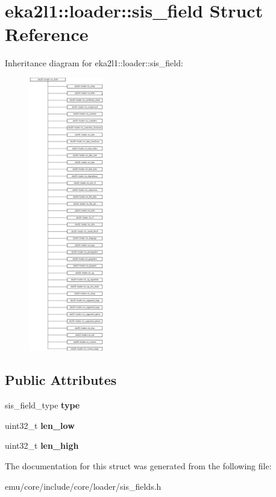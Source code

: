 \hypertarget{structeka2l1_1_1loader_1_1sis__field}{}\section{eka2l1\+:\+:loader\+:\+:sis\+\_\+field Struct Reference}
\label{structeka2l1_1_1loader_1_1sis__field}
Inheritance diagram for eka2l1\+:\+:loader\+:\+:sis\+\_\+field\+:\begin{figure}[H]
\begin{center}
\leavevmode
\includegraphics[height=12.000000cm]{structeka2l1_1_1loader_1_1sis__field}
\end{center}
\end{figure}
\subsection*{Public Attributes}
\begin{DoxyCompactItemize}
\item 
\mbox{\label{structeka2l1_1_1loader_1_1sis__field_a5154d4ff22171a592703770bfdabae35}} 
sis\+\_\+field\+\_\+type {\bfseries type}
\item 
\mbox{\label{structeka2l1_1_1loader_1_1sis__field_a8387bd8bbb6b786357b2b5ff527c1c7d}} 
uint32\+\_\+t {\bfseries len\+\_\+low}
\item 
\mbox{\label{structeka2l1_1_1loader_1_1sis__field_afade65ec526f5196704d08c2a934812f}} 
uint32\+\_\+t {\bfseries len\+\_\+high}
\end{DoxyCompactItemize}


The documentation for this struct was generated from the following file\+:\begin{DoxyCompactItemize}
\item 
emu/core/include/core/loader/sis\+\_\+fields.\+h\end{DoxyCompactItemize}
